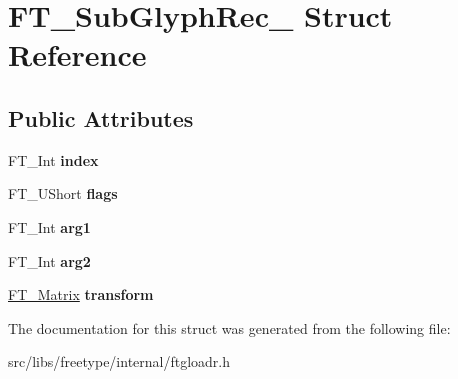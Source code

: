 \hypertarget{struct_f_t___sub_glyph_rec__}{
\section{FT\_\-SubGlyphRec\_\- Struct Reference}
\label{struct_f_t___sub_glyph_rec__}
}
\subsection*{Public Attributes}
\begin{DoxyCompactItemize}
\item 
\hypertarget{struct_f_t___sub_glyph_rec___aa4febc2d867ff074ac116b068f372d3a}{
FT\_\-Int {\bfseries index}}
\label{struct_f_t___sub_glyph_rec___aa4febc2d867ff074ac116b068f372d3a}

\item 
\hypertarget{struct_f_t___sub_glyph_rec___a2d02aefc16061f7e039f76074518f6e5}{
FT\_\-UShort {\bfseries flags}}
\label{struct_f_t___sub_glyph_rec___a2d02aefc16061f7e039f76074518f6e5}

\item 
\hypertarget{struct_f_t___sub_glyph_rec___ad9f6b04ef50e1b39db90331e76f38206}{
FT\_\-Int {\bfseries arg1}}
\label{struct_f_t___sub_glyph_rec___ad9f6b04ef50e1b39db90331e76f38206}

\item 
\hypertarget{struct_f_t___sub_glyph_rec___a0d27a8b473379cedeb061f9ecd7e97da}{
FT\_\-Int {\bfseries arg2}}
\label{struct_f_t___sub_glyph_rec___a0d27a8b473379cedeb061f9ecd7e97da}

\item 
\hypertarget{struct_f_t___sub_glyph_rec___a3c5fc1959a357c6c2b970ec2118d2683}{
\hyperlink{struct_f_t___matrix__}{FT\_\-Matrix} {\bfseries transform}}
\label{struct_f_t___sub_glyph_rec___a3c5fc1959a357c6c2b970ec2118d2683}

\end{DoxyCompactItemize}


The documentation for this struct was generated from the following file:\begin{DoxyCompactItemize}
\item 
src/libs/freetype/internal/ftgloadr.h\end{DoxyCompactItemize}
